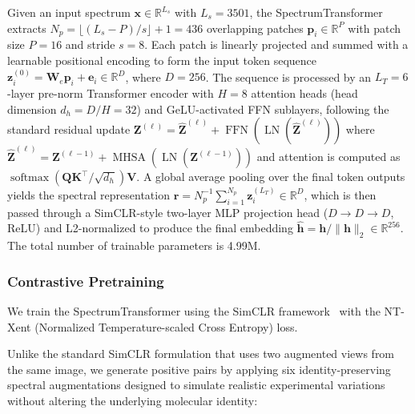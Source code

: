 \documentclass[conference]{IEEEtran}
\begin{document}
Given an input spectrum $\mathbf{x}\in\mathbb{R}^{L_s}$ with $L_s=3501$, the SpectrumTransformer extracts $N_p=\lfloor(L_s-P)/s\rfloor+1=436$ overlapping patches $\mathbf{p}_i\in\mathbb{R}^{P}$ with patch size $P=16$ and stride $s=8$. Each patch is linearly projected and summed with a learnable positional encoding to form the input token sequence $\mathbf{z}_i^{(0)}=\mathbf{W}_e\mathbf{p}_i+\mathbf{e}_i\in\mathbb{R}^{D}$, where $D=256$. The sequence is processed by an $L_T=6$-layer pre-norm Transformer encoder with $H=8$ attention heads (head dimension $d_h=D/H=32$) and GeLU-activated FFN sublayers, following the standard residual update $\mathbf{Z}^{(\ell)}=\hat{\mathbf{Z}}^{(\ell)}+\operatorname{FFN}(\operatorname{LN}(\hat{\mathbf{Z}}^{(\ell)}))$ where $\hat{\mathbf{Z}}^{(\ell)}=\mathbf{Z}^{(\ell-1)}+\operatorname{MHSA}(\operatorname{LN}(\mathbf{Z}^{(\ell-1)}))$ and attention is computed as $\operatorname{softmax}(\mathbf{Q}\mathbf{K}^{\top}/\sqrt{d_h})\mathbf{V}$. A global average pooling over the final token outputs yields the spectral representation $\mathbf{r}=N_p^{-1}\sum_{i=1}^{N_p}\mathbf{z}_i^{(L_T)}\in\mathbb{R}^{D}$, which is then passed through a SimCLR-style two-layer MLP projection head ($D\to D\to D$, ReLU) and L2-normalized to produce the final embedding $\hat{\mathbf{h}}=\mathbf{h}/\lVert\mathbf{h}\rVert_2\in\mathbb{R}^{256}$. The total number of trainable parameters is 4.99M.

\subsubsection{Contrastive Pretraining}

We train the SpectrumTransformer using the SimCLR framework~\cite{chen2020simple} with the NT-Xent (Normalized Temperature-scaled Cross Entropy) loss.

Unlike the standard SimCLR formulation that uses two augmented views from the same image, we generate positive pairs by applying six identity-preserving spectral augmentations designed to simulate realistic experimental variations without altering the underlying molecular identity:
\end{document}
